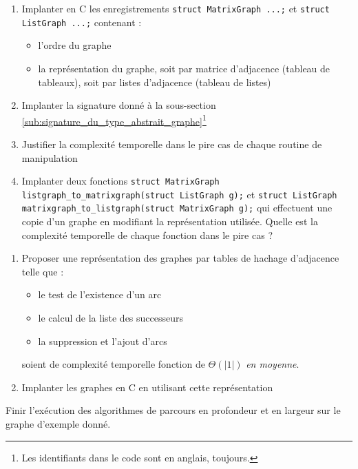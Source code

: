 \documentclass[../../../main.tex]{subfiles}
\begin{document}
\begin{enumerate}
	\item Implanter en C les enregistrements \texttt{struct MatrixGraph {...};} et \texttt{struct ListGraph {...};} contenant :
	\begin{itemize}
		\item l'ordre du graphe
		\item la représentation du graphe, soit par matrice d'adjacence (tableau de tableaux), soit par listes d'adjacence (tableau de listes)
	\end{itemize}
	\item Implanter la signature donné à la sous-section \ref{sub:signature_du_type_abstrait_graphe}\footnote{Les identifiants dans le code sont en anglais, toujours.}
	\item Justifier la complexité temporelle dans le pire cas de chaque routine de manipulation
	\item Implanter deux fonctions \texttt{struct MatrixGraph listgraph_to_matrixgraph(struct ListGraph g);} et \texttt{struct ListGraph matrixgraph_to_listgraph(struct MatrixGraph g);} qui effectuent une copie d'un graphe en modifiant la représentation utilisée. Quelle est la complexité temporelle de chaque fonction dans le pire cas ?
\end{enumerate}
\begin{enumerate}
	\item Proposer une représentation des graphes par tables de hachage d'adjacence telle que :
	\begin{itemize}
		\item le test de l'existence d'un arc
		\item le calcul de la liste des successeurs
		\item la suppression et l'ajout d'arcs
	\end{itemize}
	soient de complexité temporelle fonction de $\Theta(|1|)$ \textit{en moyenne}.
	\item Implanter les graphes en C en utilisant cette représentation
\end{enumerate}

 Finir l'exécution des algorithmes de parcours en profondeur et en largeur sur le graphe d'exemple donné.
\end{document}
